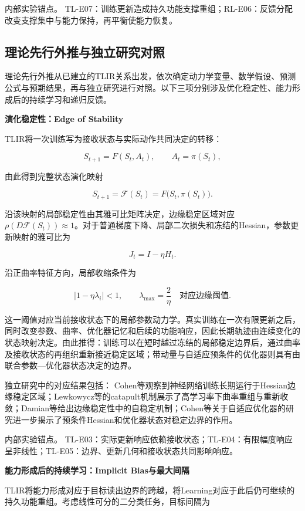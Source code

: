 内部实验锚点。 TL-E07：训练更新造成持久功能支撑重组；RL-E06：反馈分配改变支撑集中与能力保持，再平衡使能力恢复。

\subsection{理论先行外推与独立研究对照}

理论先行外推从已建立的TLIR关系出发，依次确定动力学变量、数学假设、预测公式与预期结果，再与独立研究进行对照。以下三项分别涉及优化稳定性、能力形成后的持续学习和递归反馈。

\noindent\textbf{演化稳定性：Edge of Stability}\par

TLIR将一次训练写为接收状态与实际动作共同决定的转移：

\[
S_{t+1}=F(S_t,A_t),\qquad A_t=\pi(S_t),
\]

由此得到完整状态演化映射

\[
S_{t+1}=\mathcal F(S_t)=F\bigl(S_t,\pi(S_t)\bigr).
\]

沿该映射的局部稳定性由其雅可比矩阵决定，边缘稳定区域对应\(\rho(D\mathcal F(S_t))\approx 1\)。对于普通梯度下降、局部二次损失和冻结的Hessian，参数更新映射的雅可比为

\[
J_t=I-\eta H_t.
\]

沿正曲率特征方向，局部收缩条件为

\[
|1-\eta\lambda_i|<1,
\qquad \lambda_{\max}=\frac{2}{\eta}
\quad\text{对应边缘阈值}.
\]

这一阈值对应当前接收状态下的局部参数动力学。真实训练在一次有限更新之后，同时改变参数、曲率、优化器记忆和后续的功能响应，因此长期轨迹由连续变化的状态映射决定。由此推得：训练可以在短时越过冻结的局部稳定边界后，通过曲率及接收状态的再组织重新接近稳定区域；带动量与自适应预条件的优化器则具有由联合参数—优化器状态决定的边界。

独立研究中的对应结果包括： \cite{cohen2021,lewkowycz2020,damian2023,cohen2022adaptive}Cohen等观察到神经网络训练长期运行于Hessian边缘稳定区域；Lewkowycz等的catapult机制展示了高学习率下曲率重组与重新收敛；Damian等给出边缘稳定性中的自稳定机制；Cohen等关于自适应优化器的研究进一步揭示了预条件Hessian和优化器状态对稳定边界的作用。

内部实验锚点。 TL-E03：实际更新响应依赖接收状态；TL-E04：有限幅度响应呈非线性；TL-E05：边界、更新几何和接收状态共同影响响应。

\noindent\textbf{能力形成后的持续学习：Implicit Bias与最大间隔}\par

TLIR将能力形成对应于目标读出边界的跨越，将Learning对应于此后仍可继续的持久功能重组。考虑线性可分的二分类任务，目标间隔为

